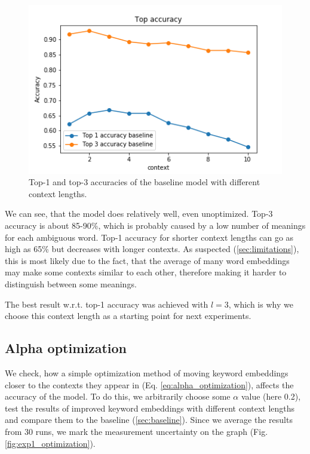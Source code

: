 \documentclass{llncs}
\begin{document}
\begin{figure}[H]
    \centering
    \caption{Top-1 and top-3 accuracies of the baseline model with different context lengths.}
    \label{fig:baseline}
    \includegraphics[scale=0.5]{res/baseline_context_top_acc.png}
\end{figure}

We can see, that the model does relatively well, even unoptimized.
Top-3 accuracy is about 85-90\%, which is probably caused by a low number of meanings for each ambiguous word.
Top-1 accuracy for shorter context lengths can go as high as 65\% but decreases with longer contexts.
As suspected (\ref{sec:limitations}), this is most likely due to the fact, that the average of many word embeddings may make some contexts similar to each other, therefore making it harder to distinguish between some meanings.

The best result w.r.t. top-1 accuracy was achieved with \(l=3\), which is why we choose this context length as a starting point for next experiments.

\subsection{Alpha optimization}
\label{sec:exp_alpha}
We check, how a simple optimization method of moving keyword embeddings closer to the contexts they appear in (Eq. \ref{eq:alpha_optimization}), affects the accuracy of the model.
To do this, we arbitrarily choose some \(\alpha\) value (here 0.2), test the results of improved keyword embeddings with different context lengths and compare them to the baseline (\ref{sec:baseline}). Since we average the results from 30 runs, we mark the measurement uncertainty on the graph (Fig. \ref{fig:exp1_optimization}).
\end{document}
